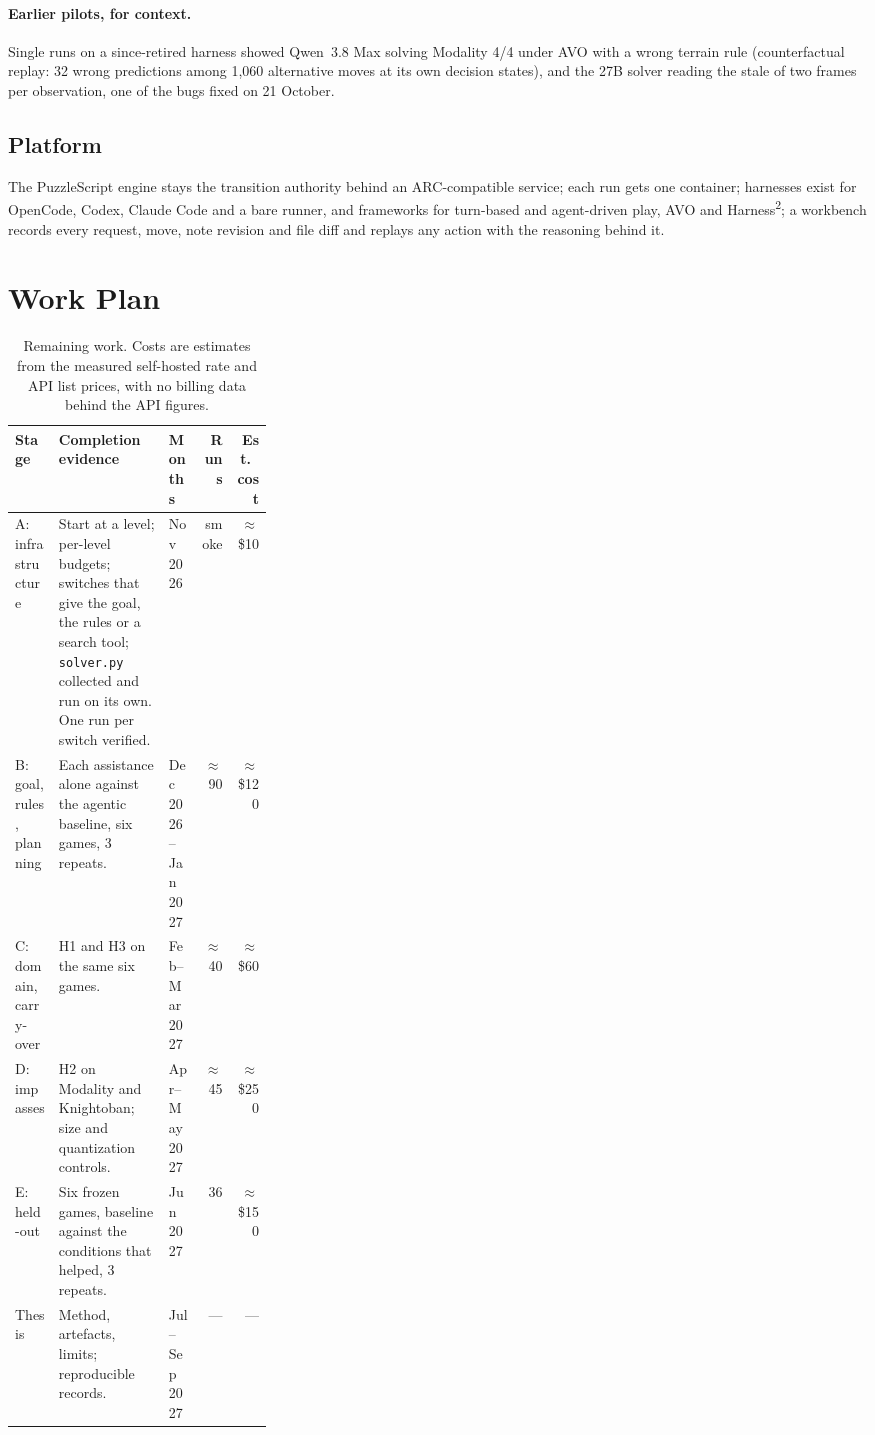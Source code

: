 \documentclass[11pt,a4paper]{article}
\newcommand{\hsq}{Harness\textsuperscript{2}}
\begin{document}
\paragraph{Earlier pilots, for context.}
Single runs on a since-retired harness showed Qwen~3.8 Max solving Modality
4/4 under AVO with a wrong terrain rule (counterfactual replay: 32 wrong
predictions among 1,060 alternative moves at its own decision states), and
the 27B solver reading the stale of two frames per observation, one of the
bugs fixed on 21 October.

\subsection{Platform}
The PuzzleScript engine stays the transition authority behind an
ARC-compatible service; each run gets one container; harnesses exist for
OpenCode, Codex, Claude Code and a bare runner, and frameworks for
turn-based and agent-driven play, AVO and \hsq{}; a workbench records every
request, move, note revision and file diff and replays any action with the
reasoning behind it.

\section{Work Plan}
\label{sec:plan}

\begin{table}[tb]
  \centering\small
  \begin{tabularx}{\linewidth}{L{0.17\linewidth} Y L{0.13\linewidth} r r}
    \toprule
    Stage & Completion evidence & Months & Runs & Est.\ cost \\
    \midrule
    A: infrastructure & Start at a level; per-level budgets; switches that
    give the goal, the rules or a search tool; \texttt{solver.py} collected
    and run on its own. One run per switch verified. & Nov 2026 & smoke &
    $\approx$\$10 \\
    B: goal, rules, planning & Each assistance alone against the agentic
    baseline, six games, 3 repeats. & Dec 2026--Jan 2027 & $\approx$90 &
    $\approx$\$120 \\
    C: domain, carry-over & H1 and H3 on the same six games. & Feb--Mar 2027 &
    $\approx$40 & $\approx$\$60 \\
    D: impasses & H2 on Modality and Knightoban; size and quantization
    controls. & Apr--May 2027 & $\approx$45 & $\approx$\$250 \\
    E: held-out & Six frozen games, baseline against the conditions that
    helped, 3 repeats. & Jun 2027 & 36 & $\approx$\$150 \\
    Thesis & Method, artefacts, limits; reproducible records. & Jul--Sep 2027 &
    --- & --- \\
    \bottomrule
  \end{tabularx}
  \caption{Remaining work. Costs are estimates from the measured self-hosted
  rate and API list prices, with no billing data behind the API figures.}
  \label{tab:milestones}
\end{table}
\end{document}
